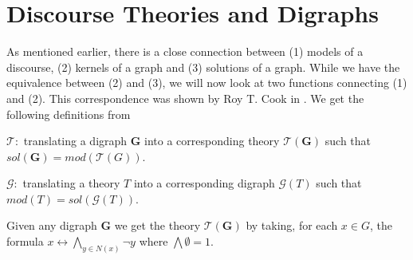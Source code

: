 \section{Discourse Theories and Digraphs}
\label{sec:Discourse Theories and Digraphs}
As mentioned earlier, there is a close connection between (1) models of a discourse, (2) kernels of a graph and (3) solutions of a graph.
While we have the equivalence between (2) and (3), we will now look at two functions connecting (1) and (2).
This correspondence was shown by Roy T. Cook in \cite{cook}.
We get the following definitions from \cite{apal-digraph}

$\mathcal{T}:$ translating a digraph \textbf{G} into a corresponding theory $\mathcal{T}(\mathbf{G})$ such that $sol(\mathbf{G}) = mod(\mathcal{T}(G))$.

$\mathcal{G}:$ translating a theory $T$ into a corresponding digraph $\mathcal{G}(T)$ such that $mod(T) = sol(\mathcal{G}(T))$.

Given any digraph \textbf{G} we get the theory $\mathcal{T}(\mathbf{G})$ by taking, for each $x \in G$, the formula $x \leftrightarrow \bigwedge_{y \in N(x)} \neg y$ where $\bigwedge \emptyset = 1$.\\

